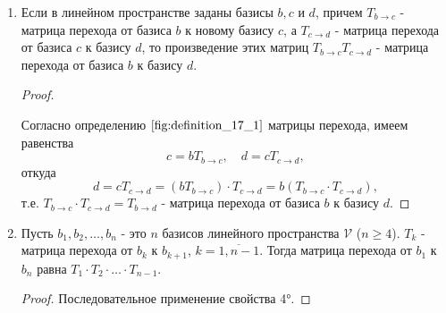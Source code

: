 \begin{enumerate}[label={\arabic*°.}]
    \item Если в линейном пространстве заданы базисы $b, c$ и $d$, причем $T_{b \to c}$ - матрица перехода от базиса $b$ к новому базису $c$, а $T_{c \to d}$ - матрица перехода от базиса $c$ к базису $d$, то произведение этих матриц $T_{b \to c}T_{c \to d}$ - матрица перехода от базиса $b$ к базису $d$.
    \begin{proof}~

        Согласно определению $\eqref{fig:definition_17_1}$ матрицы перехода, имеем равенства
        $$c = bT_{b \to c}, \quad d = cT_{c \to d},$$
        откуда
        $$d = cT_{c \to d} = (b T_{b \to c}) \cdot T_{c \to d} = b(T_{b \to c} \cdot T_{c \to d}),$$
        т.е. $T_{b \to c} \cdot T_{c \to d} = T_{b \to d}$ - матрица перехода от базиса $b$ к базису $d$.
    \end{proof}

    \item Пусть $b_1, b_2, \ldots, b_n$ - это $n$ базисов линейного пространства $\mathcal{V}$ ($n \geq 4$). $T_k$ - матрица перехода от $b_k$ к $b_{k + 1}$, $k = \overline{1, n - 1}$. Тогда матрица перехода от $b_1$ к $b_n$ равна $T_1\cdot T_2 \cdot \ldots \cdot T_{n - 1}$.
    \begin{proof}
        Последовательное применение свойства 4°.
    \end{proof}
\end{enumerate}
